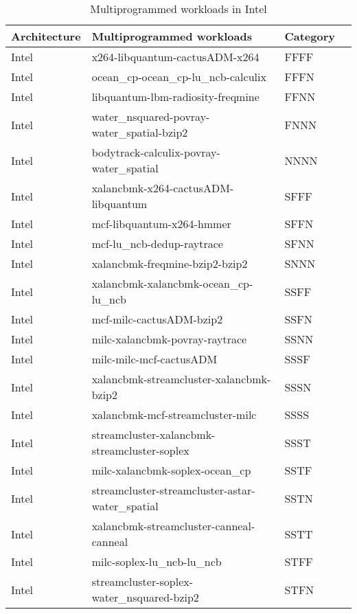 \begin{table}[htb]
    \centering
    \caption{Multiprogrammed workloads in Intel}
    
    \begin{tabular}{@{}lllr@{}}
        \toprule 
        Architecture & Multiprogrammed workloads & Category \\
        \midrule

            Intel & x264-libquantum-cactusADM-x264 & FFFF \\
            Intel & ocean\_cp-ocean\_cp-lu\_ncb-calculix & FFFN \\
            Intel & libquantum-lbm-radiosity-freqmine & FFNN \\
            Intel & water\_nsquared-povray-water\_spatial-bzip2 & FNNN \\
            Intel & bodytrack-calculix-povray-water\_spatial & NNNN \\
            Intel & xalancbmk-x264-cactusADM-libquantum & SFFF \\
            Intel & mcf-libquantum-x264-hmmer & SFFN \\
            Intel & mcf-lu\_ncb-dedup-raytrace & SFNN \\
            Intel & xalancbmk-freqmine-bzip2-bzip2 & SNNN \\
            Intel & xalancbmk-xalancbmk-ocean\_cp-lu\_ncb & SSFF \\
            Intel & mcf-milc-cactusADM-bzip2 & SSFN \\
            Intel & milc-xalancbmk-povray-raytrace & SSNN \\
            Intel & milc-milc-mcf-cactusADM & SSSF \\
            Intel & xalancbmk-streamcluster-xalancbmk-bzip2 & SSSN \\
            Intel & xalancbmk-mcf-streamcluster-milc & SSSS \\
            Intel & streamcluster-xalancbmk-streamcluster-soplex & SSST \\
            Intel & milc-xalancbmk-soplex-ocean\_cp & SSTF \\
            Intel & streamcluster-streamcluster-astar-water\_spatial & SSTN \\
            Intel & xalancbmk-streamcluster-canneal-canneal & SSTT \\
            Intel & milc-soplex-lu\_ncb-lu\_ncb & STFF \\
            Intel & streamcluster-soplex-water\_nsquared-bzip2 & STFN \\

\end{tabular}
\end{table}
